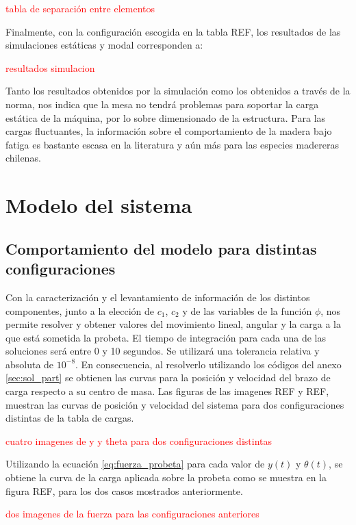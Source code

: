 \textcolor{red}{tabla de separación entre elementos}


Finalmente, con la configuración escogida en la tabla REF, los resultados de las simulaciones estáticas y modal corresponden a:

\textcolor{red}{resultados simulacion}

Tanto los resultados obtenidos por la simulación como los obtenidos a través de la norma, nos indica que la mesa no tendrá problemas para soportar la carga estática de la máquina, por lo sobre dimensionado de la estructura. Para las cargas fluctuantes, la información sobre el comportamiento de la madera bajo fatiga es bastante escasa en la literatura y aún más para las especies madereras chilenas. 

\section{Modelo del sistema}

\subsection{Comportamiento del modelo para distintas configuraciones}
Con la caracterización y el levantamiento de información de los distintos componentes, junto a la elección de $c_1$, $c_2$ y de las variables de la función $\phi$, nos permite resolver y obtener valores del movimiento lineal, angular y la carga a la que está sometida la probeta. El tiempo de integración para cada una de las soluciones será entre 0 y 10 segundos. Se utilizará una tolerancia relativa y absoluta de $10^{-8}$. En consecuencia, al resolverlo utilizando los códigos del anexo \ref{sec:sol_part} se obtienen las curvas para la posición y velocidad del brazo de carga respecto a su centro de masa. Las figuras de las imagenes REF y REF, muestran las curvas de posición y velocidad del sistema para dos configuraciones distintas de la tabla de cargas. 

\textcolor{red}{cuatro imagenes de y y theta para dos configuraciones distintas}

Utilizando la ecuación \ref{eq:fuerza_probeta} para cada valor de $y(t)$ y $\theta(t)$, se obtiene la curva de la carga aplicada sobre la probeta como se muestra en la figura REF, para los dos casos mostrados anteriormente.

\textcolor{red}{dos imagenes de la fuerza para las configuraciones anteriores}
 
